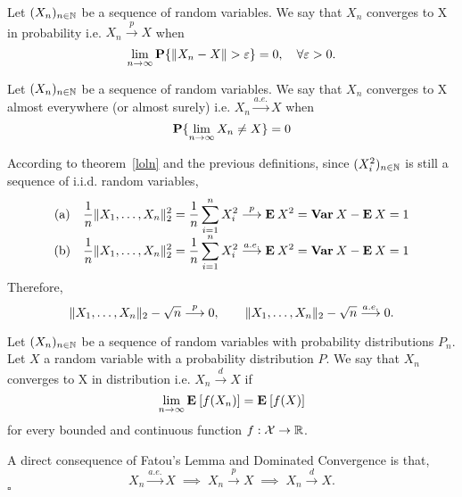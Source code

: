 \begin{definition}
Let $(X_n)_{n\in \N}$ be a sequence of random variables. We say that $X_n$ converges to X in probability i.e. $X_n \overset{p}{\to} X$ when
\[ \lim_{n\to\infty} \P\{ \| X_n-X \| > \varepsilon \} = 0,\hspace*{1em} \forall \varepsilon > 0. \]
\end{definition}

\begin{definition}
    Let $(X_n)_{n\in \N}$ be a sequence of random variables. We say that $X_n$ converges to X almost everywhere (or almost surely) i.e. $X_n \overset{a.e.}{\to} X$ when
    \[  \P\{ \lim_{n\to\infty} X_n  \neq X \} = 0\]
\end{definition}

According to theorem~\ref{loln} and the previous definitions, since $(X_i^2)_{n\in\N}$ is still a sequence of i.i.d. random variables,
\[ \everymath{\displaystyle}
\begin{array}{cc}
    \text{(a)} & \frac{1}{n}\|X_1, \ldots, X_n\|_2^2 = \frac{1}{n} \sum_{i = 1}^n X_i^2 \overset{p}{\longrightarrow} \E X^2 = \Var X - \E X = 1\\
    \text{(b)} & \frac{1}{n}\|X_1, \ldots, X_n\|_2^2 = \frac{1}{n} \sum_{i = 1}^n X_i^2 \overset{a.e.}{\longrightarrow} \E X^2 = \Var X - \E X = 1
\end{array} \]
Therefore,
\[ \|X_1, \ldots, X_n\|_2-\sqrt{n} \overset{p}{\longrightarrow} 0,\hspace*{2em}\|X_1, \ldots, X_n\|_2-\sqrt{n} \overset{a.e.}{\longrightarrow} 0. \]

\begin{definition}
    Let $(X_n)_{n\in \N}$ be a sequence of random variables with probability distributions $P_n$. Let $X$ a random variable with a probability distribution $P$. We say that $X_n$ converges to X in distribution i.e. $X_n \overset{d}{\to} X$ if
    \[ \lim_{n\to\infty} \E [f(X_n)] = \E[f(X)]\]
    for every bounded and continuous function $f : \mathcal{X}\to \R$.
\end{definition}

\begin{theorem}
    A direct consequence of Fatou's Lemma and Dominated Convergence is that,
    \[ X_n \overset{a.e.}{\longrightarrow} X \;\implies\; X_n \overset{p}{\longrightarrow} X \;\implies\; X_n \overset{d}{\longrightarrow}  X.\]
    \hfill $\square$
\end{theorem}

